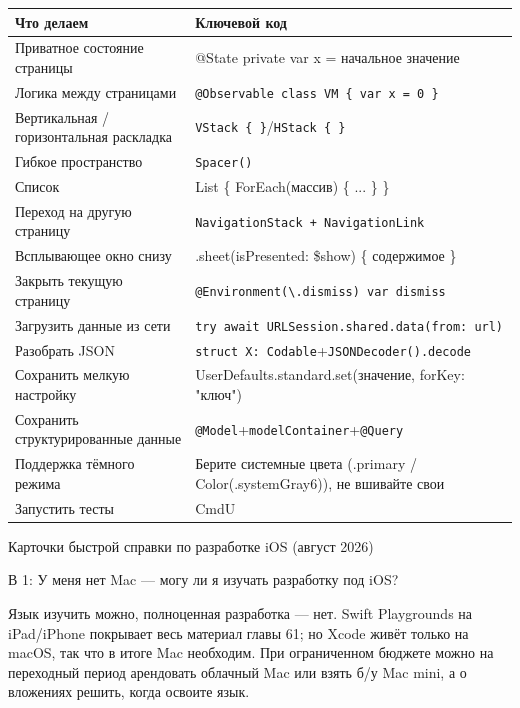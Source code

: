 


\begin{center}
\begin{tabularx}{\linewidth}{|X|X|}
\hline
\textbf{Что делаем} & \textbf{Ключевой код} \tabularnewline
\hline
Приватное состояние страницы & @State private var x = начальное значение \tabularnewline
Логика между страницами & \texttt{@Observable class VM \{ var x = 0 \}} \tabularnewline
Вертикальная / горизонтальная раскладка & \texttt{VStack \{ \}}/\texttt{HStack \{ \}} \tabularnewline
Гибкое пространство & \texttt{Spacer()} \tabularnewline
Список & List \{ ForEach(массив) \{ ... \} \} \tabularnewline
Переход на другую страницу & \texttt{NavigationStack + NavigationLink} \tabularnewline
Всплывающее окно снизу & .sheet(isPresented: \$show) \{ содержимое \} \tabularnewline
Закрыть текущую страницу & \texttt{@Environment(\textbackslash{}.\allowbreak dismiss) var dismiss} \tabularnewline
Загрузить данные из сети & \texttt{try await URLSession.\allowbreak shared.\allowbreak data(from: url)} \tabularnewline
Разобрать JSON & \texttt{struct X: Codable}+\texttt{JSONDecoder().\allowbreak decode} \tabularnewline
Сохранить мелкую настройку & UserDefaults.standard.set(значение, forKey: "ключ") \tabularnewline
Сохранить структурированные данные & \texttt{@Model}+\texttt{modelContainer}+\texttt{@Query} \tabularnewline
Поддержка тёмного режима & Берите системные цвета (.primary / Color(.systemGray6)), не вшивайте свои \tabularnewline
Запустить тесты & CmdU \tabularnewline
\hline
\end{tabularx}
\end{center}

\begin{center}\small\color{gray}Карточки быстрой справки по разработке iOS (август 2026)\end{center}


В 1: У меня нет Mac — могу ли я изучать разработку под iOS?

Язык изучить можно, полноценная разработка — нет. Swift Playgrounds на iPad/iPhone покрывает весь материал главы 61; но Xcode живёт только на macOS, так что в итоге Mac необходим. При ограниченном бюджете можно на переходный период арендовать облачный Mac или взять б/у Mac mini, а о вложениях решить, когда освоите язык.


